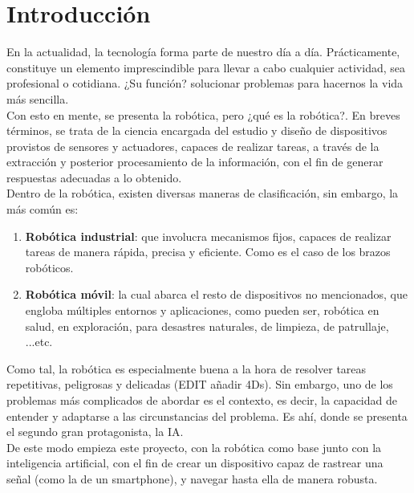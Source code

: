 \chapter{Introducción}
\label{cap:capitulo1}
\setcounter{page}{1}

En la actualidad, la tecnología forma parte de nuestro día a día. Prácticamente, constituye un elemento imprescindible para llevar a cabo cualquier actividad, sea profesional o cotidiana. ¿Su función? solucionar problemas para hacernos la vida más sencilla.\\

Con esto en mente, se presenta la robótica, pero ¿qué es la robótica?. En breves términos, se trata de la ciencia encargada del estudio y diseño de dispositivos provistos de sensores y actuadores, capaces de realizar tareas, a través de la extracción y posterior procesamiento de la información, con el fin de generar respuestas adecuadas a lo obtenido. \\

Dentro de la robótica, existen diversas maneras de clasificación, sin embargo, la más común es:

\begin{enumerate}
	\item \textbf{Robótica industrial}: que involucra mecanismos fijos, capaces de realizar tareas de manera rápida, precisa y eficiente. Como es el caso de los brazos robóticos.

	\item \textbf{Robótica móvil}: la cual abarca el resto de dispositivos no mencionados, que engloba múltiples entornos y aplicaciones, como pueden ser, robótica en salud, en exploración, para desastres naturales, de limpieza, de patrullaje, ...etc.
\end{enumerate}

Como tal, la robótica es especialmente buena a la hora de resolver tareas repetitivas, peligrosas y delicadas (EDIT añadir 4Ds). Sin embargo, uno de los problemas más complicados de abordar es el contexto, es decir, la capacidad de entender y adaptarse a las circunstancias del problema. Es ahí, donde se presenta el segundo gran protagonista, la \ac{IA}.\\

De este modo empieza este proyecto, con la robótica como base junto con la inteligencia artificial, con el fin de crear un dispositivo capaz de rastrear una señal (como la de un smartphone), y navegar hasta ella de manera robusta.\\


